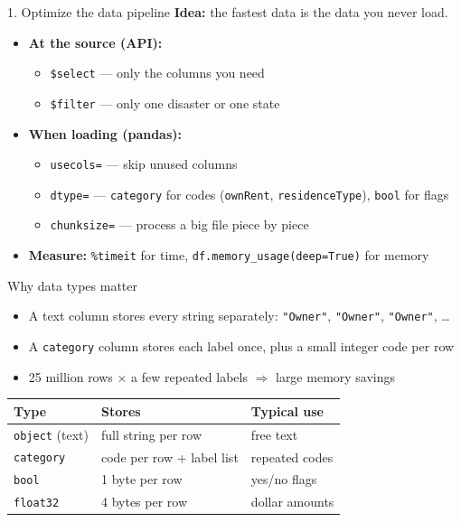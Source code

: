\documentclass[aspectratio=43,11pt]{beamer}
\begin{document}
\begin{frame}{1. Optimize the data pipeline}
  \textbf{Idea:} the fastest data is the data you never load.
  \vspace{0.6em}
  \begin{itemize}
    \item \textbf{At the source (API):}
      \begin{itemize}
        \item \texttt{\$select} --- only the columns you need
        \item \texttt{\$filter} --- only one disaster or one state
      \end{itemize}
    \item \textbf{When loading (pandas):}
      \begin{itemize}
        \item \texttt{usecols=} --- skip unused columns
        \item \texttt{dtype=} --- \texttt{category} for codes
              (\texttt{ownRent}, \texttt{residenceType}), \texttt{bool} for flags
        \item \texttt{chunksize=} --- process a big file piece by piece
      \end{itemize}
    \item \textbf{Measure:} \texttt{\%timeit} for time,
          \texttt{df.memory\_usage(deep=True)} for memory
  \end{itemize}
\end{frame}

\begin{frame}{Why data types matter}
  \begin{itemize}
    \item A text column stores every string separately:
          \texttt{"Owner"}, \texttt{"Owner"}, \texttt{"Owner"}, \dots
    \item A \texttt{category} column stores each label once,
          plus a small integer code per row
    \item 25 million rows $\times$ a few repeated labels
          $\Rightarrow$ large memory savings
  \end{itemize}
  \vspace{1em}
  \begin{center}
  \begin{tabular}{@{}lll@{}}
    \toprule
    Type & Stores & Typical use \\
    \midrule
    \texttt{object} (text) & full string per row & free text \\
    \texttt{category} & code per row + label list & repeated codes \\
    \texttt{bool} & 1 byte per row & yes/no flags \\
    \texttt{float32} & 4 bytes per row & dollar amounts \\
    \bottomrule
  \end{tabular}
  \end{center}
\end{frame}
\end{document}
